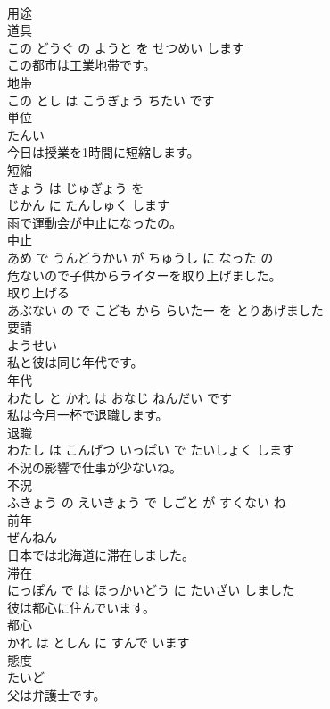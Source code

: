 \documentclass[8pt]{extreport}
\begin{document}
\begin{CJK}{UTF8}{min}
\\	用途 
\\	道具 
\\	この どうぐ の ようと を せつめい します			
\\	この都市は工業地帯です。	
\\	地帯 
\\	この とし は こうぎょう ちたい です			
\\	単位	
\\	たんい		
\\	今日は授業を1時間に短縮します。	
\\	短縮 
\\	きょう は じゅぎょう を 
\\	じかん に たんしゅく します			
\\	雨で運動会が中止になったの。	
\\	中止 
\\	あめ で うんどうかい が ちゅうし に なった の			
\\	危ないので子供からライターを取り上げました。	
\\	取り上げる 
\\	あぶない の で こども から らいたー を とりあげました			
\\	要請	
\\	ようせい		
\\	私と彼は同じ年代です。	
\\	年代 
\\	わたし と かれ は おなじ ねんだい です			
\\	私は今月一杯で退職します。	
\\	退職 
\\	わたし は こんげつ いっぱい で たいしょく します			
\\	不況の影響で仕事が少ないね。	
\\	不況 
\\	ふきょう の えいきょう で しごと が すくない ね			
\\	前年	
\\	ぜんねん		
\\	日本では北海道に滞在しました。	
\\	滞在 
\\	にっぽん で は ほっかいどう に たいざい しました			
\\	彼は都心に住んでいます。	
\\	都心 
\\	かれ は としん に すんで います			
\\	態度	
\\	たいど		
\\	父は弁護士です。	

\end{CJK}
\end{document}
